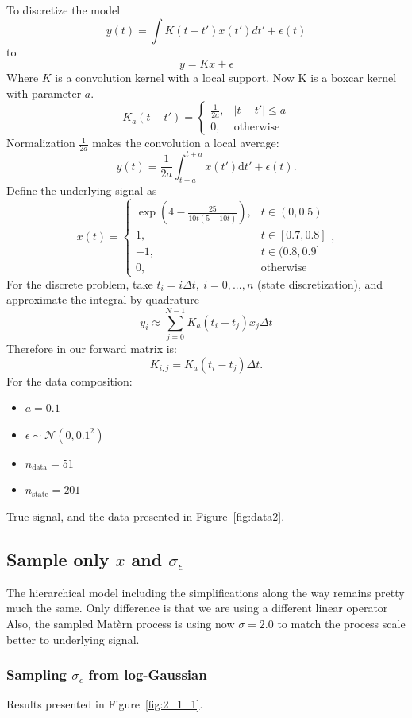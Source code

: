\documentclass[times, a4paper, 12pt, onecolumn, oneside]{article}
\begin{document}
To discretize the model
$$
y(t) = \int K(t-t')x(t')dt' + \epsilon(t)
$$
to
$$
y = Kx + \epsilon
$$
Where $K$ is a convolution kernel with a local support. Now K is a boxcar kernel with parameter $a$.
$$
K_a(t - t') = \begin{cases}\frac{1}{2a}, & |t-t'| \le a \\ 0, & \text{otherwise}\end{cases}
$$
Normalization $\frac{1}{2a}$ makes the convolution a local average:
$$
y(t) = \frac{1}{2a}\int_{t-a}^{t+a}x(t')\text{d}t' + \epsilon(t).
$$
Define the underlying signal as
$$
x(t) = \begin{cases}
\exp\left(4 - \frac{25}{10t(5 - 10t)}\right), & t\in(0,0.5) \\
1, & t\in[0.7, 0.8] \\
-1, & t\in(0.8, 0.9] \\
0, & \text{otherwise}
\end{cases},
$$
For the discrete problem, take $t_i = i \Delta t,\ i=0,...,n$ (state discretization), and approximate the integral by quadrature
$$
y_i \approx \sum_{j=0}^{N-1}K_a(t_i - t_j)x_j \Delta t
$$
Therefore in our forward matrix is:
$$
K_{i,j} = K_a(t_i - t_j) \Delta t.
$$
For the data composition:
\begin{itemize}
\item $a = 0.1$
\item $\epsilon \sim \mathcal{N}(0, 0.1^2)$ 
\item $n_\text{data} = 51$
\item $n_\text{state} = 201$
\end{itemize}
True signal, and the data presented in Figure~\ref{fig:data2}.

\subsection{Sample only $x$ and $\sigma_\epsilon$}

The hierarchical model including the simplifications along the way remains pretty much the same. Only difference is that we are using a different linear operator
Also, the sampled Matèrn process is using now $\sigma=2.0$ to match the process scale better to underlying signal.

\subsubsection{Sampling $\sigma_\epsilon$ from log-Gaussian}

Results presented in Figure~\ref{fig:2_1_1}.
\end{document}
